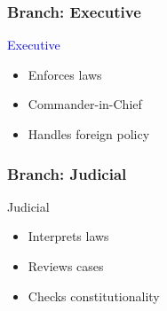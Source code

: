 \documentclass[10pt]{beamer}
\begin{document}
\begin{frame}
\frametitle{Branch: Executive}

\pause
\begin{block}{\textcolor{mediumblue}{Executive}}
\begin{itemize}
\item Enforces laws
\item Commander-in-Chief
\item Handles foreign policy
\end{itemize}
\end{block}

\end{frame}

\begin{frame}
\frametitle{Branch: Judicial}

\pause
\begin{block}{\textcolor{accentcolor}{Judicial}}
\begin{itemize}
\item Interprets laws
\item Reviews cases
\item Checks constitutionality
\end{itemize}
\end{block}

\end{frame}
\end{document}
